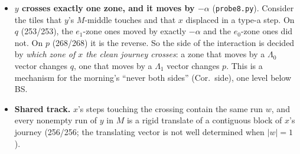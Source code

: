 \documentclass[11pt]{article}
\theoremstyle{definition}\newtheorem{definition}[theorem]{Definition}\newtheorem{remark}[theorem]{Remark}
\begin{document}
\begin{itemize}
Constancy of the sign along a run is proved in Lemma~\ref{lem:runzone}, by termination. This is Purbhoo's upper/lower wake made exact: the two half-wakes are the two zones of $x$'s rhombus, and each translates rigidly along a run.
\item \textbf{$y$ crosses exactly one zone, and it moves by $-\alpha$} (\texttt{probe8.py}). Consider the tiles that $y$'s $M$-middle touches and that $x$ displaced in a type-a step.
On $q$ (253/253), the $e_1$-zone ones moved by exactly $-\alpha$ and the $e_0$-zone ones did not. On $p$ (268/268) it is the reverse.
So the side of the interaction is decided by \emph{which zone of $x$ the clean journey crosses}: a zone that moves by a $\Lambda_0$ vector changes $q$, one that moves by a $\Lambda_1$ vector changes $p$.
This is a mechanism for the morning's ``never both sides'' (Cor.~side), one level below BS.
\item \textbf{Shared track.} $x$'s steps touching the crossing contain the same run $w$, and every nonempty run of $y$ in $M$ is a rigid translate of a contiguous block of $x$'s journey (256/256; the translating vector is not well determined when $|w|=1$).
\end{itemize}
\end{document}
